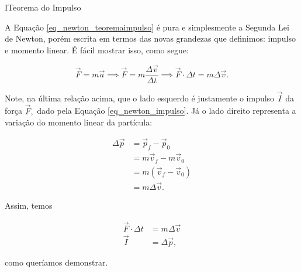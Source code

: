 \vspace{0.3cm}











\begin{secnivel}{I}{Teorema do Impulso}
  

\end{secnivel}








A Equação \eqref{eq_newton_teoremaimpulso} é pura e simplesmente a Segunda Lei de Newton, porém escrita em termos das novas grandezas que definimos: impulso e momento linear. É fácil mostrar isso, como segue:

$$\vec F = m \vec a \implies \vec F = m \dfrac{\Delta \vec v}{\Delta t} \implies  \vec F \cdot \Delta t = m \Delta \vec v.$$



Note, na última relação acima, que o lado esquerdo é justamente o impulso $\vec I$ da força $\vec F,$ dado pela Equação \eqref{eq_newton_impulso}. Já o lado direito representa a variação do momento linear da partícula:

\begin{align}
    \Delta \vec p &=\vec p_f - \vec p_0 \nonumber \\
    &= m \vec v_f - m \vec v_0  \nonumber \\
     &= m(\vec v_f - \vec v_0)  \nonumber \\
      &= m \Delta \vec v.  \nonumber
\end{align}




Assim, temos

\begin{align}
    \vec F \cdot \Delta t &= m \Delta \vec v \nonumber \\
    \vec I &= \Delta \vec p, \nonumber
\end{align}

\noindent como queríamos demonstrar.



